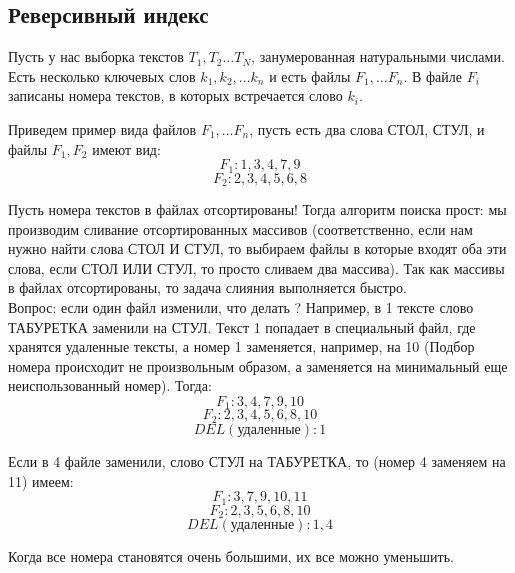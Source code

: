 \subsection {Реверсивный индекс}
Пусть у нас выборка текстов $T_1, T_2 \dots T_{N}$, занумерованная натуральными числами. Есть несколько ключевых слов $k_1, k_2, \dots k_n$ и есть файлы $F_1, \dots F_n$. В файле $F_i$ записаны номера текстов, в которых встречается слово $k_i$. 

Приведем пример вида файлов $F_1, \dots F_n$, пусть есть два слова СТОЛ, СТУЛ, и файлы $F_1, F_2$  имеют вид: \\
$$ F_1: 1,3,4,7,9 $$
$$ F_2: 2,3,4,5,6,8 $$

Пусть номера текстов в файлах отсортированы!
Тогда алгоритм поиска прост: мы производим сливание отсортированных массивов (соответственно, если нам нужно найти слова СТОЛ И СТУЛ, то выбираем файлы в которые входят оба эти слова, если  СТОЛ ИЛИ СТУЛ, то просто сливаем два массива). Так как массивы в файлах отсортированы, то задача слияния выполняется быстро.\\
Вопрос: если один файл изменили, что делать ? Например, в 1 тексте слово ТАБУРЕТКА заменили на СТУЛ. Текст 1 попадает в специальный файл, где хранятся удаленные тексты, а номер 1 заменяется, например, на 10 (Подбор номера происходит не произвольным образом, а заменяется на минимальный еще неиспользованный номер). Тогда:
$$ F_1: 3,4,7,9, 10 $$
$$ F_2: 2,3,4,5,6,8,10 $$
$$DEL (\text{удаленные}): 1$$

Если в 4 файле заменили, слово СТУЛ на ТАБУРЕТКА, то (номер 4 заменяем на 11) имеем:
$$ F_1: 3,7,9, 10, 11 $$
$$ F_2: 2,3,5,6,8,10 $$
$$DEL (\text{удаленные}): 1, 4$$

Когда все номера становятся очень большими, их все можно уменьшить.